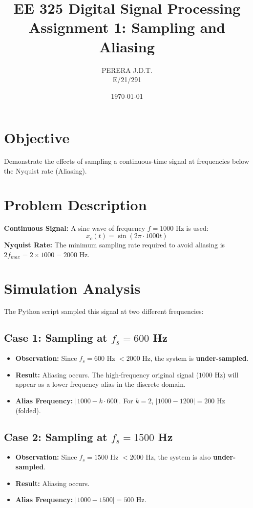 \documentclass[11pt, a4paper]{article}
\title{EE 325 Digital Signal Processing \\ Assignment 1: Sampling and Aliasing}
\author{PERERA J.D.T. \\ E/21/291}
\date{\today}
\begin{document}
\maketitle

\section{Objective}
Demonstrate the effects of sampling a continuous-time signal at frequencies below the Nyquist rate (Aliasing).

\section{Problem Description}
\textbf{Continuous Signal:}
A sine wave of frequency $f = 1000$ Hz is used:
$$x_c(t) = \sin(2\pi \cdot 1000 t)$$
\textbf{Nyquist Rate:}
The minimum sampling rate required to avoid aliasing is $2f_{max} = 2 \times 1000 = 2000$ Hz.

\section{Simulation Analysis}
The Python script sampled this signal at two different frequencies:

\subsection{Case 1: Sampling at $f_s = 600$ Hz}
\begin{itemize}
    \item \textbf{Observation:} Since $f_s = 600$ Hz $< 2000$ Hz, the system is \textbf{under-sampled}.
    \item \textbf{Result:} Aliasing occurs. The high-frequency original signal ($1000$ Hz) will appear as a lower frequency alias in the discrete domain.
    \item \textbf{Alias Frequency:} $|1000 - k \cdot 600|$. For $k=2$, $|1000 - 1200| = 200$ Hz (folded).
\end{itemize}

\subsection{Case 2: Sampling at $f_s = 1500$ Hz}
\begin{itemize}
    \item \textbf{Observation:} Since $f_s = 1500$ Hz $< 2000$ Hz, the system is also \textbf{under-sampled}.
    \item \textbf{Result:} Aliasing occurs.
    \item \textbf{Alias Frequency:} $|1000 - 1500| = 500$ Hz.
\end{itemize}
\end{document}
